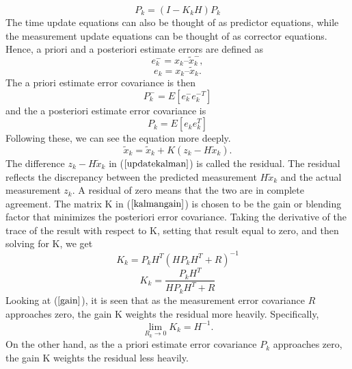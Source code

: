 \documentclass[journal]{IEEEtran}
\begin{document}
\begin{equation}
P_k = (I-K_kH)P_k
\end{equation}
The time update equations can also be thought of as predictor
equations, while the measurement update equations can be thought of
as corrector equations.
\newline
Hence, a priori and a posteriori estimate errors are defined as
\begin{equation}
e_k^- = x_k – \tilde x_k^- ,
\end{equation}
\begin{equation}
e_k =  x_k – \tilde x_k.
\end{equation}
The a priori estimate error covariance is then
\begin{equation}
P_k^- = E[ e_k^- e_k^{-T} ]
\end{equation}
and the a posteriori estimate error covariance is
\begin{equation}
P_k = E[e_k e_k^T]
\end{equation}
Following these, we can see the equation more deeply.
\begin{equation}
\tilde x_k = \tilde x_k + K(z_k-H\tilde x_k).
\label{updatekalman}
\end{equation}
The difference $z_k - H\tilde x_k$ in ($\ref{updatekalman}$) is called
the residual. The residual reflects the discrepancy between the
predicted measurement $H\tilde x_k$ and the actual measurement
$z_k$. A residual of zero means that the two are in complete
agreement. \newline
The matrix K in ($\ref{kalmangain}$) is
chosen to be the gain or blending factor that minimizes the
posteriori error covariance. Taking the derivative of the trace of
the result with respect to K, setting that result equal to zero, and
then solving for K, we get
\begin{equation}
K_k = P_kH^{T}(HP_kH^{T} + R)^{-1}
\end{equation}
\begin{equation}
K_k = \frac{P_kH^T}{HP_kH^T + R} \label{gain}
\end{equation}
Looking at ($\ref{gain}$), it is seen that as the measurement error
covariance $R$ approaches zero, the gain K weights the residual more
heavily. Specifically,
\begin{equation}
\mathop {\lim }\limits_{R_k \to 0 } {K_k} = H^{-1}.
\end{equation}
On the other hand, as the a priori estimate error covariance $P_k$
approaches zero, the gain K weights the residual less heavily.
\end{document}
